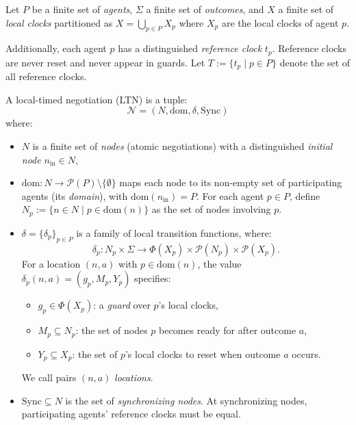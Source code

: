 \begin{definition}
\label{def:ltn}
Let $P$ be a finite set of \emph{agents}, $\Sigma$ a finite set of \emph{outcomes}, and $X$ a finite set of \emph{local clocks} partitioned as $X = \bigcup_{p \in P} X_p$ where $X_p$ are the local clocks of agent $p$.

Additionally, each agent $p$ has a distinguished \emph{reference clock} $t_p$. Reference clocks are never reset and never appear in guards. Let $T := \{t_p \mid p \in P\}$ denote the set of all reference clocks.

A \textsf{local-timed negotiation} (LTN) is a tuple:
\[
\mathcal{N} = (N, \text{dom}, \delta, \text{Sync})
\]
where:
\begin{itemize}
\item $N$ is a finite set of \emph{nodes} (atomic negotiations) with a distinguished \emph{initial node} $n_{\text{in}} \in N$,

\item $\text{dom} : N \to \mathcal{P}(P) \setminus \{\emptyset\}$ maps each node to its non-empty set of participating agents (its \emph{domain}), with $\text{dom}(n_{\text{in}}) = P$. For each agent $p \in P$, define $N_p := \{n \in N \mid p \in \text{dom}(n)\}$ as the set of nodes involving $p$.

\item $\delta = \{\delta_p\}_{p \in P}$ is a family of local transition functions, where:
\[
\delta_p : N_p \times \Sigma \to \Phi(X_p) \times \mathcal{P}(N_p) \times \mathcal{P}(X_p).
\]
For a location $(n, a)$ with $p \in \text{dom}(n)$, the value $\delta_p(n, a) = (g_p, M_p, Y_p)$ specifies:
\begin{itemize}
\item $g_p \in \Phi(X_p)$: a \emph{guard} over $p$'s local clocks,
\item $M_p \subseteq N_p$: the set of nodes $p$ becomes ready for after outcome $a$,
\item $Y_p \subseteq X_p$: the set of $p$'s local clocks to reset when outcome $a$ occurs.
\end{itemize}
We call pairs $(n, a)$ \emph{locations}.

\item $\text{Sync} \subseteq N$ is the set of \emph{synchronizing nodes}. At synchronizing nodes, participating agents' reference clocks must be equal.
\end{itemize}
\end{definition}

